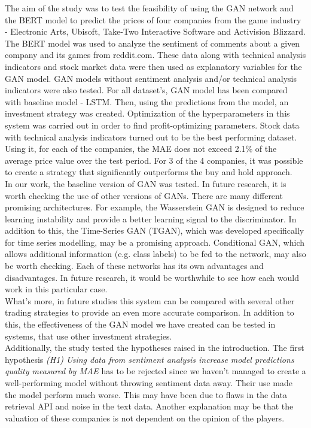 \documentclass[review]{elsarticle} %
\begin{document}
The aim of the study was to test the feasibility of using the GAN network and the BERT model to predict the prices of four companies from the game industry -  Electronic Arts, Ubisoft, Take-Two Interactive Software and Activision Blizzard. The BERT model was used to analyze the sentiment of comments about a given company and its games from reddit.com. These data along with technical analysis indicators and stock market data were then used as explanatory variables for the GAN model. GAN models without sentiment analysis and/or technical analysis indicators were also tested. For all dataset's, GAN model has been compared with baseline model - LSTM. Then, using the predictions from the model, an investment strategy was created. Optimization of the hyperparameters in this system was carried out in order to find profit-optimizing parameters. Stock data with technical analysis indicators turned out to be the best performing dataset. Using it, for each of the companies, the MAE does not exceed 2.1\% of the average price value over the test period. 
For 3 of the 4 companies, it was possible to create a strategy that significantly outperforms the buy and hold approach.  \\

In our work, the baseline version of GAN was tested. In future research, it is worth checking the use of other versions of GANs. There are many different promising architectures. For example, the Wasserstein GAN is designed to reduce learning instability and provide a better learning signal to the discriminator. In addition to this, the Time-Series GAN (TGAN), which was developed specifically for time series modelling, may be a promising approach.
Conditional GAN, which allows additional information (e.g. class labels) to be fed to the network, may also be worth checking.
Each of these networks has its own advantages and disadvantages. In future research, it would be worthwhile to see how each would work in this particular case. \\
What's more, in future studies this system can be compared with several other trading strategies to provide an even more accurate comparison. In addition to this, the effectiveness of the GAN model we have created can be tested in systems, that use other investment strategies. \\

Additionally, the study tested the hypotheses raised in the introduction. The first hypothesis \textit{(H1) Using data from sentiment analysis increase model predictions quality measured by MAE} has to be rejected since we haven't managed to create a well-performing model without throwing sentiment data away. Their use made the model perform much worse. This may have been due to flaws in the data retrieval API and noise in the text data. Another explanation may be that the valuation of these companies is not dependent on the opinion of the players. \\
\end{document}
